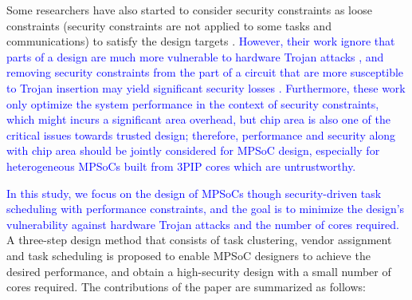 \documentclass[10pt,journal, compsoc]{IEEEtran}
\begin{document}
Some researchers have also started to consider security constraints as loose constraints (security constraints are not applied to some tasks and communications) to satisfy the design targets \cite{article:CL, article:NW, conference:NW}. \textcolor{blue}{However, their work ignore that parts of a design are much more vulnerable to hardware Trojan attacks \cite{conference:HS}, and removing security constraints from the part of a circuit that are more susceptible to Trojan insertion may yield significant security losses \cite{article:XC}. Furthermore, these work only optimize the system performance in the context of security constraints, which might incurs a significant area overhead, but chip area is also one of the critical issues towards trusted design; therefore, performance and security along with chip area should be jointly considered for MPSoC design, especially for heterogeneous MPSoCs built from 3PIP cores which are untrustworthy.}



\textcolor{blue}{In this study, we focus on the design of MPSoCs though security-driven task scheduling with performance constraints, and the goal is to minimize the design's vulnerability against hardware Trojan attacks and the number of cores required.} A three-step design method that consists of task clustering, vendor assignment and task scheduling is proposed to enable MPSoC designers to achieve the desired performance, and obtain a high-security design with a small number of cores required. The contributions of the paper are summarized as follows:

\end{document}

